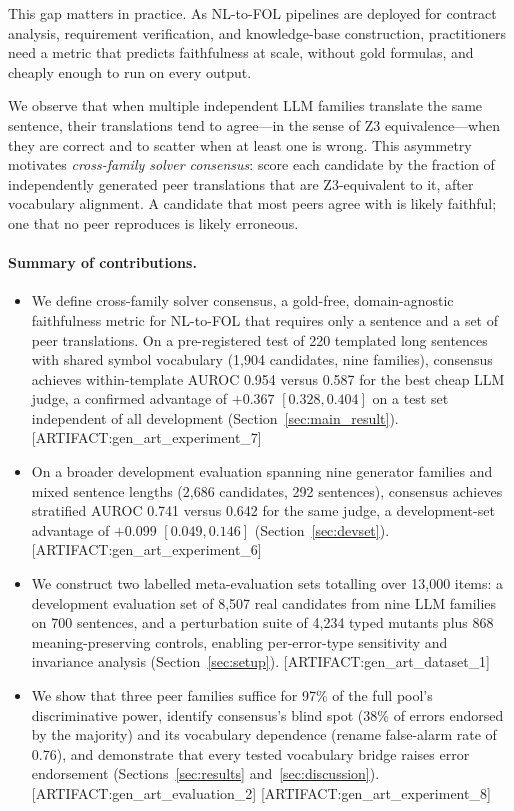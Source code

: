 \documentclass[11pt,letterpaper]{article}
\begin{document}
This gap matters in practice.
As NL-to-FOL pipelines are deployed for contract analysis, requirement verification, and knowledge-base construction, practitioners need a metric that predicts faithfulness at scale, without gold formulas, and cheaply enough to run on every output.

We observe that when multiple independent LLM families translate the same sentence, their translations tend to agree---in the sense of Z3 equivalence---when they are correct and to scatter when at least one is wrong.
This asymmetry motivates \emph{cross-family solver consensus}: score each candidate by the fraction of independently generated peer translations that are Z3-equivalent to it, after vocabulary alignment.
A candidate that most peers agree with is likely faithful; one that no peer reproduces is likely erroneous.

\paragraph{Summary of contributions.}
\begin{itemize}
\item We define cross-family solver consensus, a gold-free, domain-agnostic faithfulness metric for NL-to-FOL that requires only a sentence and a set of peer translations.
On a pre-registered test of 220 templated long sentences with shared symbol vocabulary (1,904 candidates, nine families), consensus achieves within-template AUROC 0.954 versus 0.587 for the best cheap LLM judge, a confirmed advantage of $+0.367$ $[0.328, 0.404]$ on a test set independent of all development (Section~\ref{sec:main_result}).
[ARTIFACT:gen\_art\_experiment\_7]

\item On a broader development evaluation spanning nine generator families and mixed sentence lengths (2,686 candidates, 292 sentences), consensus achieves stratified AUROC 0.741 versus 0.642 for the same judge, a development-set advantage of $+0.099$ $[0.049, 0.146]$ (Section~\ref{sec:devset}).
[ARTIFACT:gen\_art\_experiment\_6]

\item We construct two labelled meta-evaluation sets totalling over 13,000 items: a development evaluation set of 8,507 real candidates from nine LLM families on 700 sentences, and a perturbation suite of 4,234 typed mutants plus 868 meaning-preserving controls, enabling per-error-type sensitivity and invariance analysis (Section~\ref{sec:setup}).
[ARTIFACT:gen\_art\_dataset\_1]

\item We show that three peer families suffice for 97\% of the full pool's discriminative power, identify consensus's blind spot (38\% of errors endorsed by the majority) and its vocabulary dependence (rename false-alarm rate of 0.76), and demonstrate that every tested vocabulary bridge raises error endorsement (Sections~\ref{sec:results} and~\ref{sec:discussion}).
[ARTIFACT:gen\_art\_evaluation\_2] [ARTIFACT:gen\_art\_experiment\_8]
\end{itemize}
\end{document}

